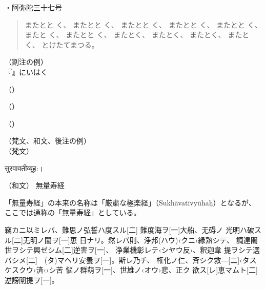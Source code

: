 \documentclass[
%
book,           %
tate,           %
twocolumn,      %
column_gap=3zw, %
paper=a4paper,  %
fontsize=17Q,   %
jafontsize=17Q, %
gutter=30mm,    %
fore-edge=25mm, %
head_space=30mm,%
foot_space=30mm,%
% 
endnote_position={_section}     %
]{jlreq}
\begin{document}
\vspace{4mm}
・阿弥陀三十七号
\begin{quote}
またとと
く、
またとと
く、
またとと
く、
またとと
く、
またとと
く、
またと
く、
またとと
く、
またとく、
またとく、
またとく、
またとく、
とけたてまつる。\\
\end{quote}

（割注の例）\\
\vspace{4mm}
『』にいはく

 （）

 （）

 （）

\vspace{4mm}
（梵文、和文、後注の例）\\

（梵文）
\begin{Sanskrit}
सुरवावतीव्यूह:।
\end{Sanskrit}

（和文）
無量寿経
\begin{kochuu}
 「無量寿経」の本来の名称は「厳粛な極楽経」（Sukhāvatīvyūhaḥ）となるが、
ここでは通称の「無量寿経」としている。
\end{kochuu}

\newpage
\Kanbun
竊カニ以ミレバ、難思ノ弘誓ハ度スル[二]
難度海ヲ[一]大船、无碍ノ
光明ハ破スル[二]无明ノ闇ヲ[一]恵
日ナリ。然レバ則、浄邦(ハウ)‹クニ›縁熟シテ、
調達闍世ヲシテ興ゼシム[二]逆害ヲ[一]、
浄業機彰レテ‹シヤウ反›、釈迦韋
提ヲシテ選バシメ[二]　(タ)マヘリ安養ヲ[一]。斯レ乃チ、
権化ノ仁、斉シク救―[二]‹タスケスクウ›済‹›シ苦
悩ノ群萌ヲ[一]、世雄ノ‹オウ›悲、正ク
欲ス[レ]恵マムト[二]逆謗闡提ヲ[一]。
\EndKanbun
\end{document}
